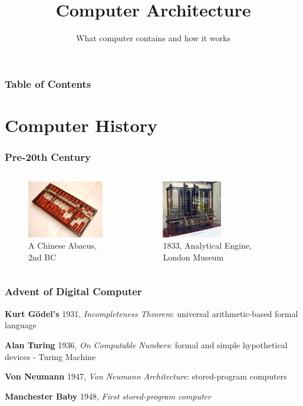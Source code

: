 \documentclass[xcolor={table, dvipsnames}]{beamer}
\title{Computer Architecture}
\subtitle{What computer contains and how it works}
\begin{document}
\frame{\titlepage}

\begin{frame}
\frametitle{Table of Contents}
\tableofcontents
\end{frame}

\section{Computer History}
\begin{frame}
\frametitle{Pre-20th Century}

\begin{columns}
\begin{figure}[h!]
  \includegraphics[height=2.5cm]{img/abacus.jpeg}
    \caption{A Chinese Abacus, 2nd BC}
\end{figure}
\begin{figure}[h!]
  \includegraphics[height=2.5cm]{img/AnalyticalMachine.jpg}
    \caption{1833, Analytical Engine, London Museum}
\end{figure}
\end{columns}

\end{frame}

\begin{frame}
\frametitle{Advent of Digital Computer}

\textbf{Kurt Gödel's} 1931, \textit{Incompleteness Theorem}: universal arithmetic-based formal language \newline \pause

\textbf{Alan Turing} 1936, \textit{On Computable Numbers}:  formal and simple hypothetical devices - Turing Machine  \newline \pause

\textbf{Von Neumann} 1947, \textit{Von Neumann Architecture}: stored-program computers \newline \pause

\textbf{Manchester Baby} 1948, \textit{First stored-program computer} 

\end{frame}
\end{document}

